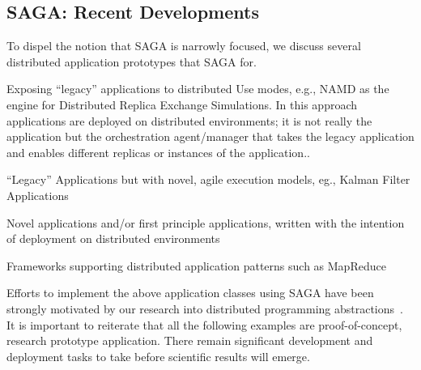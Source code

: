 \documentclass[10pt,letterpaper]{article}
\begin{document}

\subsection{SAGA: Recent Developments}




To dispel the notion that SAGA is narrowly focused, we discuss
several distributed application prototypes that SAGA 
 for.

\begin{shortlist}
\item Exposing ``legacy'' applications to distributed Use modes, e.g.,
  NAMD as the engine for Distributed Replica Exchange Simulations. In
  this approach applications are  deployed on
  distributed environments; it is not really the application but the
  orchestration agent/manager that takes the legacy application and
  enables different replicas or instances of the application..
\item ``Legacy'' Applications but with novel, agile execution models,
  eg., Kalman Filter Applications
\item Novel applications and/or first principle applications, written
  with the intention of  deployment on distributed
  environments
\item Frameworks supporting distributed application patterns such as
  MapReduce
\end{shortlist}

Efforts to implement the above application classes using SAGA have
been strongly motivated by our research into distributed programming
abstractions~\cite{dpa-wiki}.  It is important to reiterate that all
the following examples are proof-of-concept, research prototype
application. There remain significant development and deployment tasks
to take before scientific results will emerge.
\end{document}
